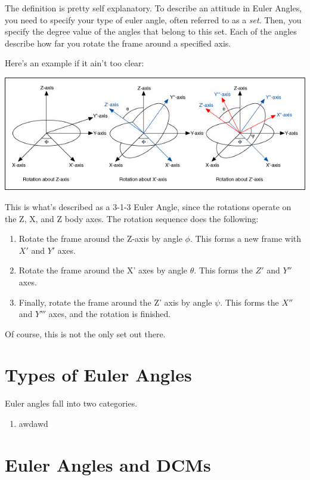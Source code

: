 \documentclass[a4paper,14pt]{extreport}
\begin{document}
The definition is pretty self explanatory. To describe an attitude in Euler Angles, you need to specify your type of euler angle, often referred to as a \emph{set}. Then, you specify the degree value of the angles that belong to this set. Each of the angles describe how far you rotate the frame around a specified axis. 

Here's an example if it ain't too clear:

\begin{center}
\includegraphics[width=16cm]{euler_proper}
\end{center}

This is what's described as a 3-1-3 Euler Angle, since the rotations operate on the Z, X, and Z body axes. The rotation sequence does the following:
\begin{enumerate}
\item Rotate the frame around the Z-axis by angle $\phi$. This forms a new frame with $X'$ and $Y'$ axes.
\item Rotate the frame around the X' axes by angle $\theta$. This forms the $Z'$ and $Y''$ axes.
\item Finally, rotate the frame around the Z' axis by angle $\psi$. This forms the $X''$ and $Y'''$ axes, and the rotation is finished.
\end{enumerate}

Of course, this is not the only set out there.

\section{Types of Euler Angles}
Euler angles fall into two categories.
\begin{enumerate}
\item{awdawd}
\end{enumerate}
\section{Euler Angles and DCMs}
\end{document}
